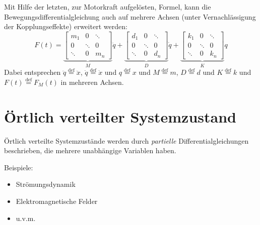 \documentclass[a4paper, 11pt, accentcolor = tud3b]{tudreport}
\begin{document}
	            Mit Hilfe der letzten, zur Motorkraft aufgelösten, Formel, kann die Bewegungsdifferentialgleichung auch auf mehrere Achsen (unter Vernachlässigung der Kopplungseffekte) erweitert werden:
	            \begin{equation*}
		            F (t) =
		            \underbrace{
			            \begin{bmatrix}
				            m _ 1 & 0 & \ddots \\
				            0 & \ddots & 0 \\
				            \ddots & 0 & m _ n
			            \end{bmatrix}
			        } _ { M }
			        \ddot{q} +
				    \underbrace{
				        \begin{bmatrix}
					        d _ 1 & 0 & \ddots \\
					        0 & \ddots & 0 \\
					        \ddots & 0 & d _ n
				        \end{bmatrix}
				    } _ { D }
				    \dot{q} +
					\underbrace{
					    \begin{bmatrix}
						    k _ 1 & 0 & \ddots \\
						    0 & \ddots & 0 \\
						    \ddots & 0 & k _ n
					    \end{bmatrix}
					} _ { K }
					q
	            \end{equation*}
	            Dabei entsprechen \( \ddot{q} \overset{\text{def}}{=} \ddot{x} \), \( \dot{q} \overset{\text{def}}{=} \dot{x} \) und \( q \overset{\text{def}}{=} x \) und \( M \overset{\text{def}}{=} m \), \( D \overset{\text{def}}{=} d \) und \( K \overset{\text{def}}{=} k \) und \( F(t) \overset{\text{def}}{=} F _ M (t) \) in mehreren Achsen.

        \section{Örtlich verteilter Systemzustand} %
            Örtlich verteilte Systemzustände werden durch \textit{partielle} Differentialgleichungen beschrieben, die mehrere unabhängige Variablen haben.
            
            Beispiele:
            \begin{itemize}
            	\item Strömungsdynamik
            	\item Elektromagnetische Felder
            	\item u.v.m.
            \end{itemize}
            
\end{document}
